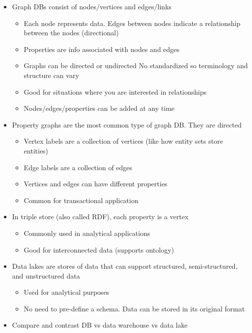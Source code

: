 \documentclass[8pt,landscape,a4paper, fleqn, dvipsnames]{extarticle}
\begin{document}
\begin{multicols*}{4}
\begin{itemize}
\begin{itemize}
    \end{itemize}
    \item Graph DBs consist of nodes/vertices and edges/links
    \begin{itemize}
        \item Each node represents data. Edges between nodes indicate a relationship between the nodes (directional)
        \item Properties are info associated with nodes and edges        \item Graphs can be directed or undirected
        No standardized so terminology and structure can vary
        \item Good for situations where you are interested in relationships
        \item Nodes/edges/properties can be added at any time
    \end{itemize}
    \item Property graphs are the most common type of graph DB. They are directed
    \begin{itemize}
        \item Vertex labels are a collection of vertices (like how entity sets store entities)
        \item Edge labels are a collection of edges
        \item Vertices and edges can have different properties
        \item Common for transactional application
    \end{itemize}
    \item In triple store (also called RDF), each property is a vertex
    \begin{itemize}
        \item Commonly used in analytical applications
        \item Good for interconnected data (supports ontology)
    \end{itemize}
    \item Data lakes are stores of data that can support structured, semi-structured, and unstructured data
    \begin{itemize}
        \item Used for analytical purposes
        \item No need to pre-define a schema. Data can be stored in its original format
    \end{itemize}
    \item Compare and contrast DB vs data warehouse vs data lake
    \begin{itemize}

\end{itemize}
\end{itemize}
\end{multicols*}
\end{document}
